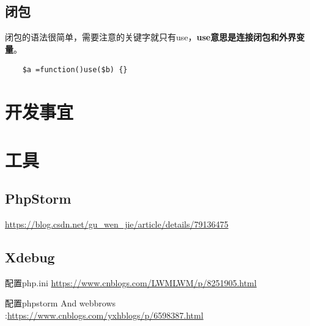\documentclass[UTF8,a4paper,12pt]{ctexbook}
\begin{document}
	
	\section{闭包}
		闭包的语法很简单，需要注意的关键字就只有use，\textbf{use意思是连接闭包和外界变量}。
		\begin{lstlisting}
	$a =function()use($b) {}
		\end{lstlisting}
		
		
\chapter{开发事宜}
 
 
 
\chapter{工具}
	\section{PhpStorm}
		\url{https://blog.csdn.net/gu_wen_jie/article/details/79136475}
	
	\section{Xdebug}
		配置php.ini \url{https://www.cnblogs.com/LWMLWM/p/8251905.html}
		
		配置phpstorm And webbrows :\url{https://www.cnblogs.com/yxhblogs/p/6598387.html}
 		  			
\end{document}
